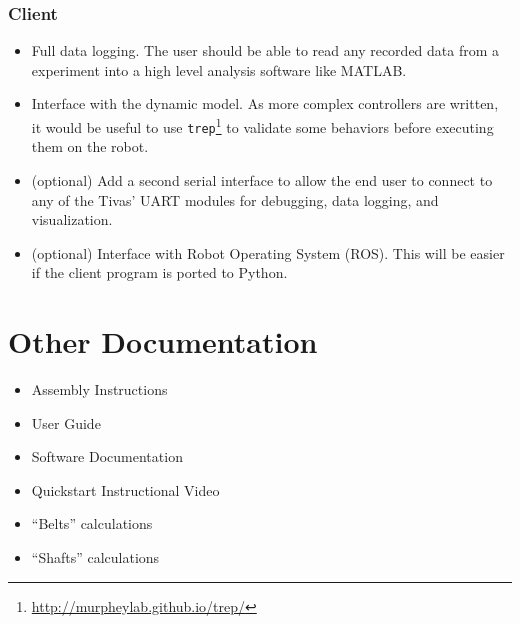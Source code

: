 \documentclass{report}
\begin{document}
\subsection[Client]{Client}
\begin{itemize}
\item Full data logging. The user should be able to read any recorded data from a experiment into a high level analysis software like MATLAB.
\item Interface with the dynamic model. As more complex controllers are written, it would be useful to use \texttt{trep}\footnote{\url{http://murpheylab.github.io/trep/}} to validate some behaviors before executing them on the robot.
\item (optional) Add a second serial interface to allow the end user to connect to any of the Tivas' UART modules for debugging, data logging, and visualization.
\item (optional) Interface with Robot Operating System (ROS). This will be easier if the client program is ported to Python.
\end{itemize}

\chapter[Other Documentation]{Other Documentation}
\begin{itemize}
\item Assembly Instructions
\item User Guide
\item Software Documentation
\item Quickstart Instructional Video
\item ``Belts'' calculations
\item ``Shafts'' calculations
\end{itemize}



\end{document}
